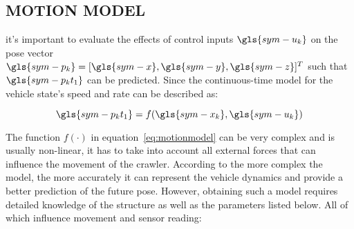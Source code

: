 \subsection{MOTION MODEL}\label{sec:motion model}

it's important to evaluate the effects of control inputs \( \gls{sym-u_k} \) on the pose vector \( \gls{sym-p_k} =
[\gls{sym-x}, \gls{sym-y}, \gls{sym-z}]^T \) such that \( \gls{sym-p_kt_1} \) can be predicted. Since the
continuous-time model for the vehicle state's speed and rate can be described as:

\begin{equation}
    \label{eq:motionmodel}
    \gls{sym-p_kt_1} = f(\gls{sym-x_k},\gls{sym-u_k})
\end{equation}

The function \( f(\cdot) \) in equation~\ref{eq:motionmodel} can be very complex and is usually non-linear, it has to
take into account all external forces that can influence the movement of the crawler. According to 
\citet{bahr_cooperative_2009} the more complex the model, the more accurately it can represent the vehicle dynamics 
and provide a better prediction of the future pose. However, obtaining such a model requires detailed knowledge of 
the structure as well as the parameters listed below. All of which influence movement and sensor reading:

